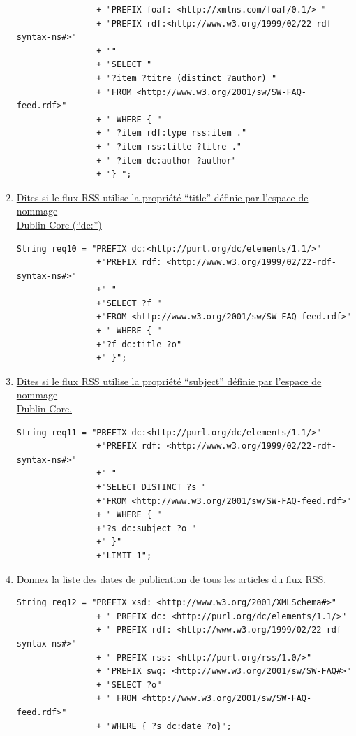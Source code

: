 \documentclass[12pt,a4paper]{article}
\begin{document}
\begin{justify}
\begin{enumerate}
\begin{verbatim}
                + "PREFIX foaf: <http://xmlns.com/foaf/0.1/> "
                + "PREFIX rdf:<http://www.w3.org/1999/02/22-rdf-syntax-ns#>"
                + ""
                + "SELECT "
                + "?item ?titre (distinct ?author) "
                + "FROM <http://www.w3.org/2001/sw/SW-FAQ-feed.rdf>"
                + " WHERE { "
                + " ?item rdf:type rss:item ."
                + " ?item rss:title ?titre ."
                + " ?item dc:author ?author"
                + "} ";
            \end{verbatim}
            \item  \underline{Dites si le flux RSS utilise la propri\'et\'e “title” d\'efinie par l\rq{espace} de nommage}\\ \underline{ Dublin Core (“dc:”)} \\
            \begin{verbatim}
String req10 = "PREFIX dc:<http://purl.org/dc/elements/1.1/>"
                +"PREFIX rdf: <http://www.w3.org/1999/02/22-rdf-syntax-ns#>"
                +" "
                +"SELECT ?f "
                +"FROM <http://www.w3.org/2001/sw/SW-FAQ-feed.rdf>"
                + " WHERE { "
                +"?f dc:title ?o"
                +" }";
            \end{verbatim}
            \item \underline{Dites si le flux RSS utilise la propriété “subject” définie par l’espace de nommage} \\ \underline{Dublin Core.}
            \begin{verbatim}
String req11 = "PREFIX dc:<http://purl.org/dc/elements/1.1/>"
                +"PREFIX rdf: <http://www.w3.org/1999/02/22-rdf-syntax-ns#>"
                +" "
                +"SELECT DISTINCT ?s "
                +"FROM <http://www.w3.org/2001/sw/SW-FAQ-feed.rdf>"
                + " WHERE { "
                +"?s dc:subject ?o "
                +" }"
                +"LIMIT 1";
            \end{verbatim}
            \item \underline{Donnez la liste des dates de publication de tous les articles du flux RSS.}
            \begin{verbatim}
String req12 = "PREFIX xsd: <http://www.w3.org/2001/XMLSchema#>"
                + " PREFIX dc: <http://purl.org/dc/elements/1.1/>"
                + " PREFIX rdf: <http://www.w3.org/1999/02/22-rdf-syntax-ns#>"
                + " PREFIX rss: <http://purl.org/rss/1.0/>"
                + "PREFIX swq: <http://www.w3.org/2001/sw/SW-FAQ#>"
                + "SELECT ?o"
                + " FROM <http://www.w3.org/2001/sw/SW-FAQ-feed.rdf>"
                + "WHERE { ?s dc:date ?o}";
            \end{verbatim}
        \end{enumerate}
    \end{justify}
\end{document}
